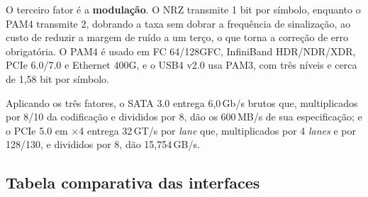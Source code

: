 \documentclass[11pt,a4paper]{article}
\begin{document}

\medskip
O terceiro fator é a \textbf{modulação}. O NRZ transmite 1 bit por símbolo, enquanto o PAM4
transmite 2, dobrando a taxa sem dobrar a frequência de sinalização, ao custo de reduzir a margem de
ruído a um terço, o que torna a correção de erro obrigatória. O PAM4 é usado em FC 64/128GFC,
InfiniBand HDR/NDR/XDR, PCIe 6.0/7.0 e Ethernet 400G, e o USB4 v2.0 usa PAM3, com três níveis e cerca
de 1,58 bit por símbolo.

Aplicando os três fatores, o SATA 3.0 entrega 6,0\,Gb/s brutos que, multiplicados por 8/10 da
codificação e divididos por 8, dão os 600\,MB/s de sua especificação; e o PCIe 5.0 em $\times$4
entrega 32\,GT/s por \textit{lane} que, multiplicados por 4 \textit{lanes} e por 128/130, e divididos
por 8, dão 15,754\,GB/s.

\subsection{Tabela comparativa das interfaces}
\end{document}
